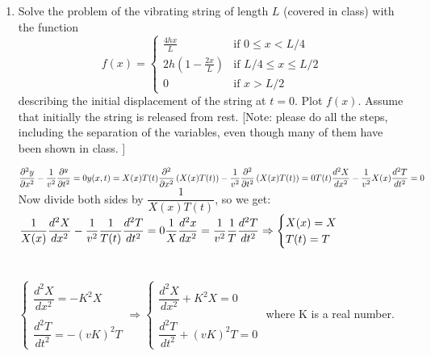 \documentclass[fleqn]{article}
\begin{document}
  \begin{enumerate}
    \item  Solve the problem of the vibrating string of length $L$ (covered in class) with the function
      $$f(x)=\begin{cases} \frac{4 h x}{L} &\mbox{if } 0 \leq x < L/4 \\ 
      2 h \left( 1 - \frac{2x}{L}\right) &\mbox{if }  L/4  \leq x \leq L/2 \\ 
      0 & \mbox{if } x > L/2 \end{cases} $$
      describing the initial displacement of the string at $t=0$. Plot $f(x)$. Assume that initially the string is released from rest. [Note: please do all the steps, including the separation of the variables, even though many of them have been shown in class. ]

      \textcolor{hwColor}{
        $
          \dfrac{\partial^2y}{\partial x^2}-\dfrac{1}{v^2}\dfrac{\partial^y}{\partial t^2}=0
          \\
          \\
          y(x,t)=X(x)T(t) \\
          \\
          \dfrac{\partial^2}{\partial x^2}\left(X(x)T(t)\right)-\dfrac{1}{v^2}\dfrac{\partial^2}{\partial t^2}\left(X(x)T(t)\right)=0 \\
          \\
          T(t)\dfrac{d^2X}{dx^2}-\dfrac{1}{v^2}X(x)\dfrac{d^2T}{dt^2}=0 \\
          \\
        $ 
        Now divide both sides by $\dfrac{1}{X(x)T(t)}$, so we get:
        $
          \dfrac{1}{X(x)}\dfrac{d^2X}{dx^2}-\dfrac{1}{v^2}\dfrac{1}{T(t)}\dfrac{d^2T}{dt^2}=0 \\
          \\
          \\
          \dfrac{1}{X}\dfrac{d^2x}{dx^2}=\dfrac{1}{v^2}\dfrac{1}{T}\dfrac{d^2T}{dt^2} \Rightarrow \begin{cases}
            X(x)=X \\
            T(t)=T
          \end{cases}
        $ \\
        \\
        \\
        $
          \begin{cases}
            \dfrac{d^2X}{dx^2}=-K^2X \\
            \\
            \dfrac{d^2T}{dt^2}=-(vK)^2T
          \end{cases} \Rightarrow \begin{cases}
            \dfrac{d^2X}{dx^2}+K^2X=0 \\
            \\
            \dfrac{d^2T}{dt^2}+(vK)^2T=0
          \end{cases}
        $ where K is a real number. \\
        \\
      }


\end{enumerate}
\end{document}
